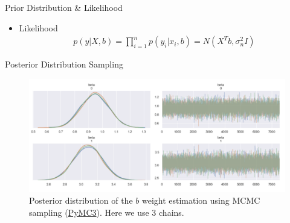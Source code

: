 \documentclass[10pt]{beamer}
\begin{document}
\begin{frame}{Prior Distribution \& Likelihood}
\begin{itemize}
\begin{center}
\begin{figure}
\caption{Prior Distribution, for this example
$
\Sigma_p=
\left(
\begin{array}{cc}
2 & 1 \\
1 & 2
\end{array}
\right).
$
}
\end{figure}
\end{center}
\pause
\item Likelihood
\begin{align*}
p(y|X, b) 
= \prod_{i=1}^{n}p(y_i|x_i, b) 
= N(X^T b, \sigma_n^2 I)
\end{align*}
\end{itemize}
\end{frame}

\begin{frame}{Posterior Distribution Sampling }{\cite{pymc3}}
\begin{center}
\begin{figure}
\includegraphics[scale=0.25]{images/lin_posterior_pymc3.png} 
\caption{Posterior distribution of the $b$ weight estimation using MCMC sampling (\href{https://docs.pymc.io/}{PyMC3}). Here we use 3 chains. }
\end{figure}
\end{center}
\end{frame}
\end{document}
